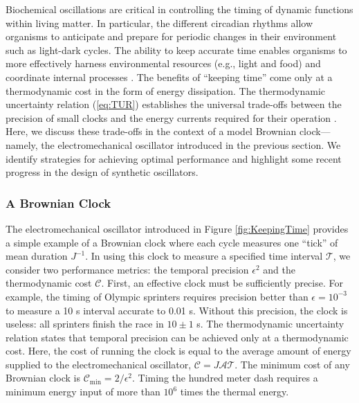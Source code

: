 \begin{appendices}
Biochemical oscillations are critical in controlling the timing of dynamic functions within living matter.  In particular, the different circadian rhythms allow organisms to anticipate and prepare for periodic changes in their environment such as light-dark cycles. The ability to keep accurate time enables organisms to more effectively harness environmental resources (e.g., light and food) and coordinate internal processes \autocite{Sharma2003}. The benefits of ``keeping time'' come only at a thermodynamic cost \autocite{Cao2015, Barato2016} in the form of energy dissipation. The thermodynamic uncertainty relation (\ref{eq:TUR}) establishes the universal trade-offs between the precision of small clocks and the energy currents required for their operation \autocite{Barato2016}.  Here, we discuss these trade-offs in the context of a model Brownian clock---namely, the electromechanical oscillator introduced in the previous section.  We identify strategies for achieving optimal performance and highlight some recent progress in the design of synthetic oscillators. 

\subsubsection{A Brownian Clock}

The electromechanical oscillator introduced in Figure \ref{fig:KeepingTime} provides a simple example of a Brownian clock \autocite{Barato2016} where each cycle measures one ``tick'' of mean duration $J^{-1}$.  In using this clock to measure a specified time interval $\mathcal{T}$, we consider two performance metrics: the temporal precision $\epsilon^2$ and the thermodynamic cost $\mathcal{C}$.  First, an effective clock must be sufficiently precise.  For example, the timing of Olympic sprinters requires precision better than $\epsilon=10^{-3}$ to measure a 10 s interval accurate to 0.01 s.  Without this precision, the clock is useless: all sprinters finish the race in $10\pm1$ s.  The thermodynamic uncertainty relation states that temporal precision can be achieved only at a thermodynamic cost.  Here, the cost of running the clock is equal to the average amount of energy supplied to the electromechanical oscillator, $\mathcal{C}= J\mathcal{A}\mathcal{T}$.  The minimum cost of any Brownian clock is $\mathcal{C}_{\min} = 2/\epsilon^2$.  Timing the hundred meter dash requires a minimum energy input of more than $10^{6}$ times the thermal energy.


\end{appendices}

